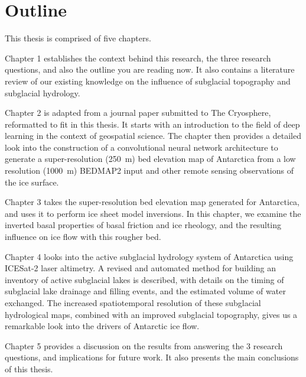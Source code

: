 \section{Outline}

This thesis is comprised of five chapters.

Chapter 1 establishes the context behind this research, the three research questions, and also the outline you are reading now.
It also contains a literature review of our existing knowledge on the influence of subglacial topography and subglacial hydrology.

Chapter 2 is adapted from a journal paper submitted to The Cryosphere, reformatted to fit in this thesis.
It starts with an introduction to the field of deep learning in the context of geospatial science.
The chapter then provides a detailed look into the construction of a convolutional neural network architecture to generate a super-resolution (\SI{250}{\metre}) bed elevation map of Antarctica from a low resolution (\SI{1000}{\metre}) BEDMAP2 input and other remote sensing observations of the ice surface.

Chapter 3 takes the super-resolution bed elevation map generated for Antarctica, and uses it to perform ice sheet model inversions.
In this chapter, we examine the inverted basal properties of basal friction and ice rheology, and the resulting influence on ice flow with this rougher bed.

Chapter 4 looks into the active subglacial hydrology system of Antarctica using ICESat-2 laser altimetry.
A revised and automated method for building an inventory of active subglacial lakes is described, with details on the timing of subglacial lake drainage and filling events, and the estimated volume of water exchanged.
The increased spatiotemporal resolution of these subglacial hydrological maps, combined with an improved subglacial topography, gives us a remarkable look into the drivers of Antarctic ice flow.

Chapter 5 provides a discussion on the results from answering the 3 research questions, and implications for future work.
It also presents the main conclusions of this thesis.
